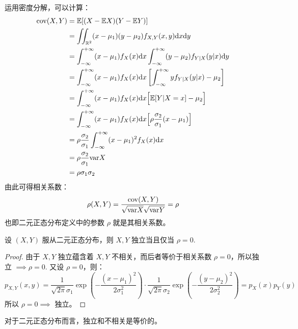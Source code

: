 \begin{theorem}[二元正态分布的协方差与相关系数]
运用密度分解，可以计算：
\begin{align*}
\text{cov}(X,Y)&=\mathbb E[(X-\mathbb EX)(Y-\mathbb EY)]\\
&=\iint_{\mathbb{R}^2}(x-\mu_1)(y-\mu_2)f_{X,Y}(x,y)\mathrm dx\mathrm dy\\
&=\int_{-\infty}^{+\infty}(x-\mu_1)f_X(x)\mathrm dx\int_{-\infty}^{+\infty}(y-\mu_2)f_{Y|X}(y|x)\mathrm dy\\
&=\int_{-\infty}^{+\infty}(x-\mu_1)f_X(x)\mathrm dx\left[\int_{-\infty}^{+\infty}yf_{Y|X}(y|x)-\mu_2\right]\\
&=\int_{-\infty}^{+\infty}(x-\mu_1)f_X(x)\mathrm dx\Big[\mathbb E[Y|X=x]-\mu_2\Big]\\
&=\int_{-\infty}^{+\infty}(x-\mu_1)f_X(x)\mathrm dx\Big[\rho\frac{\sigma_2}{\sigma_1}(x-\mu_1)\Big]\\
&=\rho\frac{\sigma_2}{\sigma_1}\int_{-\infty}^{+\infty}(x-\mu_1)^2f_X(x)\mathrm dx\\
&=\rho\frac{\sigma_2}{\sigma_1}\mathrm{var} X\\
&=\rho\sigma_1\sigma_2
\end{align*}
由此可得相关系数：
$$
\rho(X,Y)=\frac{\mathrm{cov}(X,Y)}{\sqrt{\mathrm{var} X}\sqrt{\mathrm{var} Y}}=\rho
$$
也即二元正态分布定义中的参数 $\rho$ 就是其相关系数。
\end{theorem}

\begin{theorem}[二元正态分布的独立性]
设 $(X,Y)$ 服从二元正态分布，则 $X,Y$ 独立当且仅当 $\rho=0$. 
\end{theorem}
\begin{proof}
由于 $X,Y$ 独立蕴含着 $X,Y$ 不相关，而后者等价于相关系数 $\rho=0$，所以独立 $\implies\rho=0$. 又设 $\rho=0$，则：
$$
p_{X,Y}(x,y)=\frac{1}{\sqrt{2\pi}\sigma_1}\exp\left(-\frac{(x-\mu_1)^2}{2\sigma_1^2}\right)\cdot \frac{1}{\sqrt{2\pi}\sigma_2}\exp\left(-\frac{(y-\mu_2)^2}{2\sigma_2^2}\right)=p_X(x)p_Y(y)
$$
所以 $\rho=0\implies$ 独立。
\end{proof}
\begin{corollary}
对于二元正态分布而言，独立和不相关是等价的。
\end{corollary}

